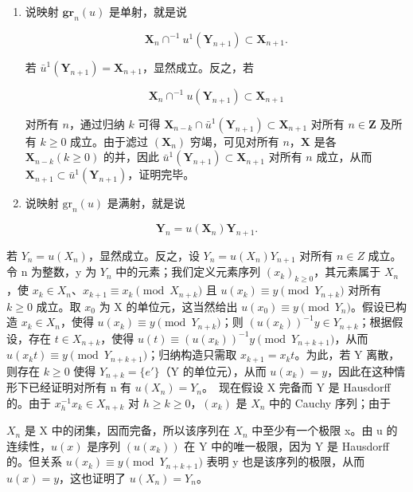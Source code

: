 \begin{enumerate}
\def\labelenumi{(\roman{enumi})}
\tightlist
\item
  说映射 \(\mathbf{gr}_n(u)\) 是单射，就是说

\[
\mathbf {X} _ {n} \cap^ {- 1} u ^ {1} (\mathbf {Y} _ {n + 1}) \subset \mathbf {X} _ {n + 1}.
\]

若 \(\bar{u}^1 (\mathbf{Y}_{n + 1}) = \mathbf{X}_{n + 1}\)，显然成立。反之，若

\[
\mathbf {X} _ {n} \cap^ {- 1} u (\mathbf {Y} _ {n + 1}) \subset \mathbf {X} _ {n + 1}
\]

	对所有 \(n\)，通过归纳 \(k\) 可得 \(\mathbf{X}_{n-k} \cap \bar{u}^1(\mathbf{Y}_{n+1}) \subset \mathbf{X}_{n+1}\) 对所有 \(n \in \mathbf{Z}\) 及所有 \(k \geqslant 0\) 成立。由于滤过 \((\mathbf{X}_n)\) 穷竭，可见对所有 \(n\)，\(\mathbf{X}\) 是各 \(\mathbf{X}_{n-k} (k \geqslant 0)\) 的并，因此 \(\bar{u}^1(\mathbf{Y}_{n+1}) \subset \mathbf{X}_{n+1}\) 对所有 \(n\) 成立，从而 \(\mathbf{X}_{n+1} \subset \bar{u}^1(\mathbf{Y}_{n+1})\)，证明完毕。

\item
  说映射 \(\mathrm{gr}_n(u)\) 是满射，就是说
\end{enumerate}

\[
\mathbf {Y} _ {n} = u (\mathbf {X} _ {n}) \mathbf {Y} _ {n + 1}.
\]

	若 \(Y_{n}=u(X_{n})\)，显然成立。反之，设 \(Y_{n}=u(X_{n})Y_{n+1}\) 对所有 \(n\in Z\) 成立。令 n 为整数，y 为 \(Y_{n}\) 中的元素；我们定义元素序列 \((x_{k})_{k\geq0}\)，其元素属于 \(X_{n}\)，使 \(x_{k}\in X_{n}\)、\(x_{k+1}\equiv x_{k} \pmod{X_{n+k}}\) 且 \(u(x_{k})\equiv y \pmod{Y_{n+k}}\) 对所有 \(k\geq0\) 成立。取 \(x_{0}\) 为 X 的单位元，这当然给出 \(u(x_{0})\equiv y \pmod{Y_{n}}\)。假设已构造 \(x_{k}\in X_{n}\)，使得 \(u(x_{k})\equiv y \pmod{Y_{n+k}}\)；则 \((u(x_{k}))^{-1}y\in Y_{n+k}\)；根据假设，存在 \(t\in X_{n+k}\)，使得 \(u(t)\equiv(u(x_{k}))^{-1}y \pmod{Y_{n+k+1}}\)，从而 \(u(x_{k}t)\equiv y \pmod{Y_{n+k+1}}\)；归纳构造只需取 \(x_{k+1}=x_{k}t\)。为此，若 Y 离散，则存在 \(k\geq0\) 使得 \(Y_{n+k}=\{e'\}\)（Y 的单位元），从而 \(u(x_{k})=y\)，因此在这种情形下已经证明对所有 n 有 \(u(X_{n})=Y_{n}\)。~现在假设 X 完备而 Y 是 Hausdorff 的。由于 \(x_{h}^{-1}x_{k}\in X_{n+k}\) 对 \(h\geq k\geq0\)，\((x_{k})\) 是 \(X_{n}\) 中的 Cauchy 序列；由于

\(X_{n}\) 是 X 中的闭集，因而完备，所以该序列在 \(X_{n}\) 中至少有一个极限 x。由 u 的连续性，\(u(x)\) 是序列 \((u(x_{k}))\) 在 Y 中的唯一极限，因为 Y 是 Hausdorff 的。但关系 \(u(x_{k}) \equiv y \pmod{Y_{n+k+1}}\) 表明 y 也是该序列的极限，从而 \(u(x) = y\)，这也证明了 \(u(X_{n}) = Y_{n}\)。

